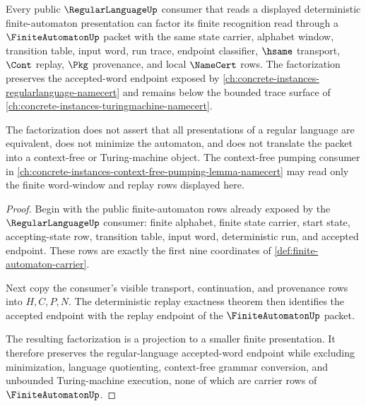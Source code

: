 \begin{theorem}
\label{thm:finite-automaton-regular-language-consumer}
Every public $\RegularLanguageUp$ consumer that reads a displayed deterministic
finite-automaton presentation can factor its finite recognition read through a
$\FiniteAutomatonUp$ packet with the same state carrier, alphabet window,
transition table, input word, run trace, endpoint classifier, $\hsame$
transport, $\Cont$ replay, $\Pkg$ provenance, and local $\NameCert$ rows. The
factorization preserves the accepted-word endpoint exposed by
\autoref{ch:concrete-instances-regularlanguage-namecert} and remains below the
bounded trace surface of
\autoref{ch:concrete-instances-turingmachine-namecert}.

The factorization does not assert that all presentations of a regular language
are equivalent, does not minimize the automaton, and does not translate the
packet into a context-free or Turing-machine object. The context-free pumping
consumer in
\autoref{ch:concrete-instances-context-free-pumping-lemma-namecert} may read
only the finite word-window and replay rows displayed here.
\end{theorem}
\begin{proof}
Begin with the public finite-automaton rows already exposed by the
$\RegularLanguageUp$ consumer: finite alphabet, finite state carrier, start
state, accepting-state row, transition table, input word, deterministic run,
and accepted endpoint. These rows are exactly the first nine coordinates of
\autoref{def:finite-automaton-carrier}.

Next copy the consumer's visible transport, continuation, and provenance rows
into $H,C,P,N$. The deterministic replay exactness theorem then identifies the
accepted endpoint with the replay endpoint of the $\FiniteAutomatonUp$ packet.

The resulting factorization is a projection to a smaller finite presentation.
It therefore preserves the regular-language accepted-word endpoint while
excluding minimization, language quotienting, context-free grammar conversion,
and unbounded Turing-machine execution, none of which are carrier rows of
$\FiniteAutomatonUp$.
\end{proof}


